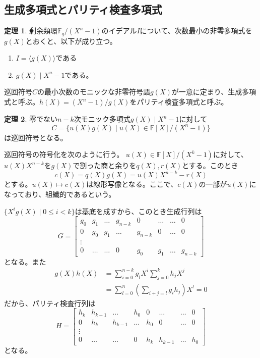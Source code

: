 \documentclass{jsarticle}
\newcommand{\F}{\mathbb{F}}
\renewcommand{\(}{\left(}
\renewcommand{\)}{\right)}
\newcommand{\braket}[1]{\langle #1 \rangle}
\theoremstyle{definition}
\newtheorem{thm}{定理}
\begin{document}
\subsection{生成多項式とパリティ検査多項式}

\begin{thm}
    剰余類環$\F_q / (X^n - 1)$のイデアル$I$について、次数最小の非零多項式を$g(X)$とおくと、以下が成り立つ。
    \begin{enumerate}
        \item $I = \braket{g(X)}$である
        \item $g(X) \mid X^n - 1$である。
    \end{enumerate}
\end{thm}

巡回符号$C$の最小次数のモニックな非零符号語$g(X)$が一意に定まり、生成多項式と呼ぶ。$h(X) = (X^n - 1) / g(X)$をパリティ検査多項式と呼ぶ。

\begin{thm}
    零でない$n - k$次モニック多項式$g(X) \mid X^n - 1$に対して
        \[C = \{u(X)g(X) \mid u(X) \in \F[X] / (X^n - 1)\}\]
    は巡回符号となる。
\end{thm}

巡回符号の符号化を次のように行う。
$u(X) \in \F[X] / (X^k - 1)$に対して、$u(X)X^{n-k}$を$g(X)$で割った商と余りを$q(X), r(X)$とする。このとき
    \[c(X) = q(X)g(X) = u(X)X^{n-k} - r(X)\]
とする。$u(X) \mapsto c(X)$は線形写像となる。ここで、$c(X)$の一部が$u(X)$になっており、組織的であるという。

$\{X^ig(X) \mid 0 \leq i < k\}$は基底を成すから、このとき生成行列は
    \[G = \begin{bmatrix}
        g_0 & g_1 & \dots & g_{n-k} & 0 & \dots & \dots & 0\\
        0 & g_0 & g_1 & \dots & g_{n-k} & 0 & \dots & 0\\
        \vdots\\
        0 & \dots & \dots & 0 & g_0 & g_1 & \dots & g_{n-k}
    \end{bmatrix}\]
となる。また
\begin{align*}
    g(X)h(X)
    &= \sum_{i=0}^{n-k} g_iX^i \sum_{j=0}^k h_jX^j\\
    &= \sum_{l=0}^n \(\sum_{i+j=l} g_ih_j\) X^l = 0
\end{align*}
だから、パリティ検査行列は
    \[H = \begin{bmatrix}
        h_k & h_{k-1} & \dots & h_0 & 0 & \dots & \dots & 0\\
        0 & h_k & h_{k-1} & \dots & h_0 & 0 & \dots & 0\\
        \vdots\\
        0 & \dots & \dots & 0 & h_k & h_{k-1} & \dots & h_0
    \end{bmatrix}\]
となる。
\end{document}
